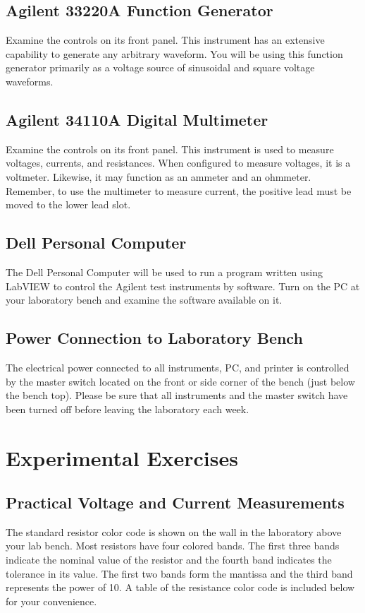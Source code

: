 \documentclass[12pt]{../manual}
\begin{document}
\subsection{Agilent 33220A Function Generator}
Examine the controls on its front panel. This instrument has an extensive capability to generate any arbitrary waveform. You will be using this function generator primarily as a voltage source of sinusoidal and square voltage waveforms. 

\subsection{Agilent 34110A Digital Multimeter}
Examine the controls on its front panel. This instrument is used to measure voltages, currents, and resistances. When configured to measure voltages, it is a voltmeter. Likewise, it may function as an ammeter and an ohmmeter. Remember, to use the multimeter to measure current, the positive lead must be moved to the lower lead slot. 

\subsection{Dell Personal Computer}
The Dell Personal Computer will be used to run a program written using LabVIEW to control the Agilent test instruments by software. Turn on the PC at your laboratory bench and examine the software available on it. 
 
\subsection{Power Connection to Laboratory Bench}
The electrical power connected to all instruments, PC, and printer is controlled by the master switch located on the front or side corner of the bench (just below the bench top). Please be sure that all instruments and the master switch have been turned off before leaving the laboratory each week. 

\section{Experimental Exercises}
\subsection{Practical Voltage and Current Measurements}
The standard resistor color code is shown on the wall in the laboratory above your lab bench. Most resistors have four colored bands. The first three bands indicate the nominal value of the resistor and the fourth band indicates the tolerance in its value. The first two bands form the mantissa and the third band represents the power of 10. A table of the resistance color code is included below for your convenience.
\end{document}
